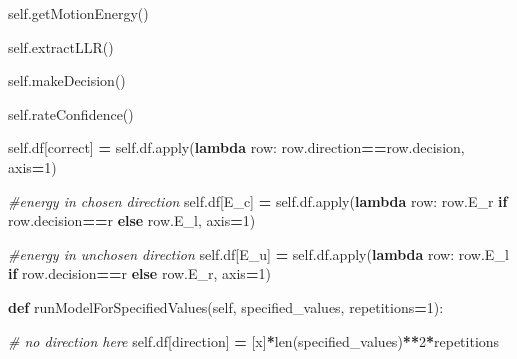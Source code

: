 \documentclass[12pt,twoside]{reedthesis}
\newenvironment{Shaded}{\begin{snugshade}}{\end{snugshade}}
\newcommand{\BuiltInTok}[1]{#1}
\newcommand{\CommentTok}[1]{\textcolor[rgb]{0.56,0.35,0.01}{\textit{#1}}}
\newcommand{\ControlFlowTok}[1]{\textcolor[rgb]{0.13,0.29,0.53}{\textbf{#1}}}
\newcommand{\DecValTok}[1]{\textcolor[rgb]{0.00,0.00,0.81}{#1}}
\newcommand{\KeywordTok}[1]{\textcolor[rgb]{0.13,0.29,0.53}{\textbf{#1}}}
\newcommand{\NormalTok}[1]{#1}
\newcommand{\OperatorTok}[1]{\textcolor[rgb]{0.81,0.36,0.00}{\textbf{#1}}}
\newcommand{\StringTok}[1]{\textcolor[rgb]{0.31,0.60,0.02}{#1}}
\newcommand{\VariableTok}[1]{\textcolor[rgb]{0.00,0.00,0.00}{#1}}
\begin{document}
\begin{Shaded}
\begin{Highlighting}[]
        \VariableTok{self}\NormalTok{.getMotionEnergy()}
        
        \VariableTok{self}\NormalTok{.extractLLR()}

        \VariableTok{self}\NormalTok{.makeDecision()}

        \VariableTok{self}\NormalTok{.rateConfidence()}
        
        \VariableTok{self}\NormalTok{.df[}\StringTok{\textquotesingle{}correct\textquotesingle{}}\NormalTok{] }\OperatorTok{=} \VariableTok{self}\NormalTok{.df.}\BuiltInTok{apply}\NormalTok{(}\KeywordTok{lambda}\NormalTok{ row: }
\NormalTok{               row.direction}\OperatorTok{==}\NormalTok{row.decision, axis}\OperatorTok{=}\DecValTok{1}\NormalTok{)}
        
        \CommentTok{\#energy in chosen direction}
        \VariableTok{self}\NormalTok{.df[}\StringTok{\textquotesingle{}E\_c\textquotesingle{}}\NormalTok{] }\OperatorTok{=} \VariableTok{self}\NormalTok{.df.}\BuiltInTok{apply}\NormalTok{(}\KeywordTok{lambda}\NormalTok{ row: }
\NormalTok{                                       row.E\_r }\ControlFlowTok{if}\NormalTok{ row.decision}\OperatorTok{==}\StringTok{\textquotesingle{}r\textquotesingle{}} 
                                       \ControlFlowTok{else}\NormalTok{ row.E\_l, axis}\OperatorTok{=}\DecValTok{1}\NormalTok{)}
        
        \CommentTok{\#energy in unchosen direction}
        \VariableTok{self}\NormalTok{.df[}\StringTok{\textquotesingle{}E\_u\textquotesingle{}}\NormalTok{] }\OperatorTok{=} \VariableTok{self}\NormalTok{.df.}\BuiltInTok{apply}\NormalTok{(}\KeywordTok{lambda}\NormalTok{ row: }
\NormalTok{                                       row.E\_l }\ControlFlowTok{if}\NormalTok{ row.decision}\OperatorTok{==}\StringTok{\textquotesingle{}r\textquotesingle{}} 
                                       \ControlFlowTok{else}\NormalTok{ row.E\_r, axis}\OperatorTok{=}\DecValTok{1}\NormalTok{)}
    
    \KeywordTok{def}\NormalTok{ runModelForSpecifiedValues(}\VariableTok{self}\NormalTok{, }
\NormalTok{          specified\_values, }
\NormalTok{          repetitions}\OperatorTok{=}\DecValTok{1}\NormalTok{):}

        \CommentTok{\# no direction here}
        \VariableTok{self}\NormalTok{.df[}\StringTok{\textquotesingle{}direction\textquotesingle{}}\NormalTok{] }\OperatorTok{=} 
\NormalTok{          [}\StringTok{\textquotesingle{}x\textquotesingle{}}\NormalTok{]}\OperatorTok{*}\BuiltInTok{len}\NormalTok{(specified\_values)}\OperatorTok{**}\DecValTok{2}\OperatorTok{*}\NormalTok{repetitions}
        

\end{Highlighting}
\end{Shaded}
\end{document}
